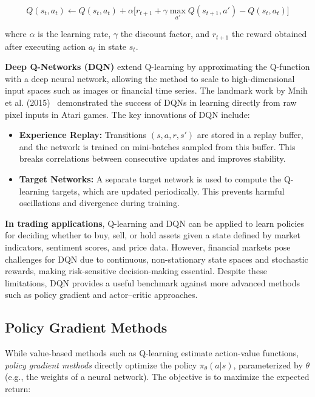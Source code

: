 \documentclass[12pt,a4paper]{report}
\begin{document}
\[
Q(s_t, a_t) \leftarrow Q(s_t, a_t) + \alpha \Big[ r_{t+1} + \gamma \max_{a'} Q(s_{t+1}, a') - Q(s_t, a_t) \Big]
\]

where $\alpha$ is the learning rate, $\gamma$ the discount factor, and $r_{t+1}$ the reward obtained after executing action $a_t$ in state $s_t$.

\bigskip

\textbf{Deep Q-Networks (DQN)} extend Q-learning by approximating the Q-function with a deep neural network, allowing the method to scale to high-dimensional input spaces such as images or financial time series. The landmark work by Mnih et al. (2015)~\cite{mnih2015human} demonstrated the success of DQNs in learning directly from raw pixel inputs in Atari games. The key innovations of DQN include:
\begin{itemize}
    \item \textbf{Experience Replay:} Transitions $(s, a, r, s')$ are stored in a replay buffer, and the network is trained on mini-batches sampled from this buffer. This breaks correlations between consecutive updates and improves stability.
    \item \textbf{Target Networks:} A separate target network is used to compute the Q-learning targets, which are updated periodically. This prevents harmful oscillations and divergence during training.
\end{itemize}

\bigskip

\textbf{In trading applications}, Q-learning and DQN can be applied to learn policies for deciding whether to buy, sell, or hold assets given a state defined by market indicators, sentiment scores, and price data. However, financial markets pose challenges for DQN due to continuous, non-stationary state spaces and stochastic rewards, making risk-sensitive decision-making essential. Despite these limitations, DQN provides a useful benchmark against more advanced methods such as policy gradient and actor–critic approaches.

\subsection{Policy Gradient Methods}

While value-based methods such as Q-learning estimate action-value functions, \textit{policy gradient methods} directly optimize the policy $\pi_{\theta}(a|s)$, parameterized by $\theta$ (e.g., the weights of a neural network). The objective is to maximize the expected return:
\end{document}
